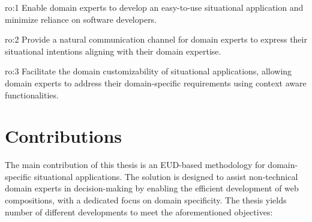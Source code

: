 \begin{researchobjective}{ro:1}
Enable domain experts to develop an easy-to-use situational application and minimize reliance on software developers. 
\end{researchobjective}

\begin{researchobjective}{ro:2}
Provide a natural communication channel for domain experts to express their situational intentions aligning with their domain expertise.
\end{researchobjective}

\begin{researchobjective}{ro:3}
Facilitate the domain customizability of situational applications, allowing domain experts to address their domain-specific requirements using context aware functionalities. 
\end{researchobjective}


\vspace{-15pt}
\hypertarget{contributions}{%
\section{Contributions}\label{sec:introduction.contributions}}
\vspace{15pt}

The main contribution of this thesis is an EUD-based methodology for domain-specific situational applications. The solution is designed to assist non-technical domain experts in decision-making by enabling the efficient development of web compositions, with a dedicated focus on domain specificity. The thesis yields number of different developments to meet the aforementioned objectives:

